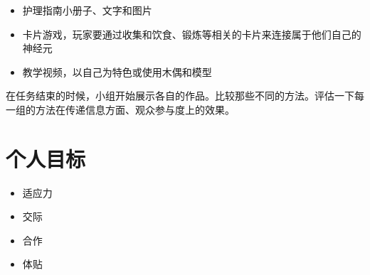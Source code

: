     \begin{itemize}
      \item 护理指南小册子、文字和图片
      \item 卡片游戏，玩家要通过收集和饮食、锻炼等相关的卡片来连接属于他们自己的神经元
      \item 教学视频，以自己为特色或使用木偶和模型
    \end{itemize}  
    在任务结束的时候，小组开始展示各自的作品。比较那些不同的方法。评估一下每一组的方法在传递信息方面、观众参与度上的效果。

\section{个人目标}
    \begin{itemize}
      \item 适应力
      \item 交际
      \item 合作
      \item 体贴   
    \end{itemize}  
